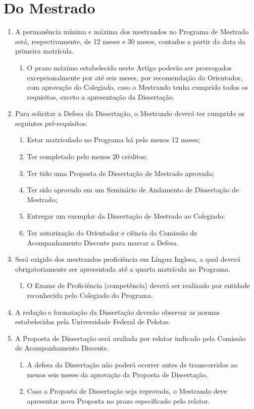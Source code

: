 \documentclass{article}
\newcommand{\singleitem}{\item[Parágrafo Único.]}
\begin{document}
\section{Do Mestrado}
\begin{enumerate}
	\item A permanência mínima e máxima dos mestrandos no Programa de Mestrado será, respectivamente, de 12 meses e 30 meses, contados a partir da data da primeira matrícula.
	\begin{enumerate}
		\singleitem O prazo máximo estabelecido neste Artigo poderão ser prorrogados excepcionalmente por até seis meses, por recomendação do Orientador, com aprovação do Colegiado, caso o Mestrando tenha cumprido todos os requisitos, exceto a apresentação da Dissertação.
	\end{enumerate}

	\item Para solicitar a Defesa da Dissertação, o Mestrando deverá ter cumprido os seguintes pré-requisitos:
	\begin{enumerate}[label=\Roman*]
		\item 	Estar matriculado no Programa há pelo menos 12 meses;
		\item 	Ter completado pelo menos 20 créditos;
		\item 	Ter tido uma Proposta de Dissertação de Mestrado aprovada;
		\item 	Ter sido aprovado em um Seminário de Andamento de Dissertação de Mestrado;
		\item 	Entregar um exemplar da Dissertação de Mestrado ao Colegiado;
		\item 	Ter autorização do Orientador e ciência da Comissão de Acompanhamento Discente para marcar a Defesa.
	\end{enumerate}

	\item Será exigido dos mestrandos proficiência em Língua Inglesa, a qual deverá obrigatoriamente ser apresentada até a quarta matrícula no Programa.
	\begin{enumerate}
		\singleitem O Exame de Proficiência (competência) deverá ser realizado por entidade reconhecida pelo Colegiado do Programa.
	\end{enumerate}

	\item A redação e formatação da Dissertação deverão observar as normas estabelecidas pela Universidade Federal de Pelotas.

	\item A Proposta de Dissertação será avaliada por relator indicado pela Comissão de Acompanhamento Discente.
	\begin{enumerate}
		\item A defesa da Dissertação não poderá ocorrer antes de transcorridos ao menos seis meses da aprovação da Proposta de Dissertação.
		\item Caso a Proposta de Dissertação seja reprovada, o Mestrando deve apresentar nova Proposta no prazo especificado pelo relator.
	\end{enumerate}


\end{enumerate}
\end{document}
